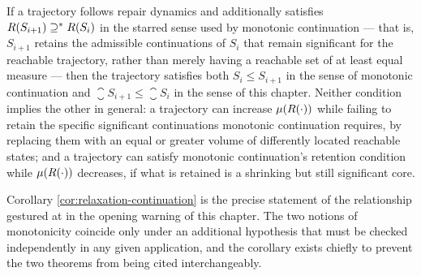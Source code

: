 \begin{corollary}
\label{cor:relaxation-continuation}
If a trajectory follows repair dynamics and additionally satisfies
$R(S_{i+1}) \supseteq^{*} R(S_i)$ in the starred sense used by
monotonic continuation --- that is, $S_{i+1}$ retains the admissible
continuations of $S_i$ that remain significant for the reachable
trajectory, rather than merely having a reachable set of at least equal
measure --- then the trajectory satisfies both $S_i \le S_{i+1}$ in the
sense of monotonic continuation and $\closure{S_{i+1}} \le \closure{S_i}$
in the sense of this chapter. Neither condition implies the other in
general: a trajectory can increase $\mu(R(\cdot))$ while failing to
retain the specific significant continuations monotonic continuation
requires, by replacing them with an equal or greater volume of
differently located reachable states; and a trajectory can satisfy
monotonic continuation's retention condition while $\mu(R(\cdot))$
decreases, if what is retained is a shrinking but still significant
core.
\end{corollary}

Corollary \ref{cor:relaxation-continuation} is the precise statement of
the relationship gestured at in the opening warning of this chapter.
The two notions of monotonicity coincide only under an additional
hypothesis that must be checked independently in any given application,
and the corollary exists chiefly to prevent the two theorems from being
cited interchangeably.
